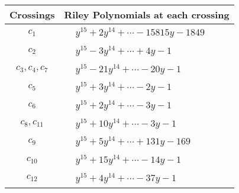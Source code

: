 \documentclass[1p]{elsarticle_modified}
\theoremstyle{definition}
\begin{document}
\begin{tabular}{m{50pt}|m{274pt}}
Crossings & \hspace{64pt}Riley Polynomials at each crossing \\
\hline $$\begin{aligned}c_{1}\end{aligned}$$&$\begin{aligned}
&y^{15}+2 y^{14}+\cdots-15815 y-1849
\end{aligned}$\\
\hline $$\begin{aligned}c_{2}\end{aligned}$$&$\begin{aligned}
&y^{15}-3 y^{14}+\cdots+4 y-1
\end{aligned}$\\
\hline $$\begin{aligned}c_{3},c_{4},c_{7}\end{aligned}$$&$\begin{aligned}
&y^{15}-21 y^{14}+\cdots-20 y-1
\end{aligned}$\\
\hline $$\begin{aligned}c_{5}\end{aligned}$$&$\begin{aligned}
&y^{15}+3 y^{14}+\cdots-2 y-1
\end{aligned}$\\
\hline $$\begin{aligned}c_{6}\end{aligned}$$&$\begin{aligned}
&y^{15}+2 y^{14}+\cdots-3 y-1
\end{aligned}$\\
\hline $$\begin{aligned}c_{8},c_{11}\end{aligned}$$&$\begin{aligned}
&y^{15}+10 y^{14}+\cdots-3 y-1
\end{aligned}$\\
\hline $$\begin{aligned}c_{9}\end{aligned}$$&$\begin{aligned}
&y^{15}+5 y^{14}+\cdots+131 y-169
\end{aligned}$\\
\hline $$\begin{aligned}c_{10}\end{aligned}$$&$\begin{aligned}
&y^{15}+15 y^{14}+\cdots-14 y-1
\end{aligned}$\\
\hline $$\begin{aligned}c_{12}\end{aligned}$$&$\begin{aligned}
&y^{15}+4 y^{14}+\cdots-37 y-1
\end{aligned}$\\
\hline
\end{tabular}\\~\\
\end{document}
